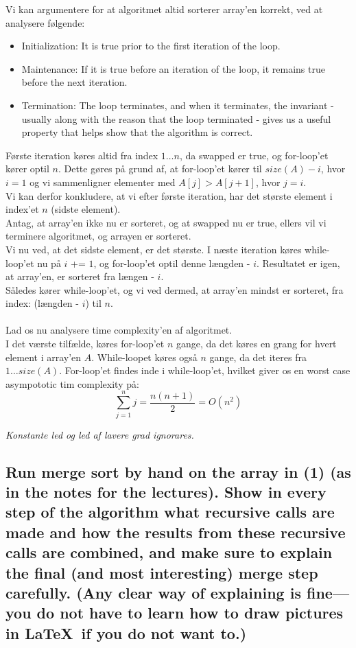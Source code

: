 \documentclass[a4paper,12pt]{article}
\begin{document}
Vi kan argumentere for at algoritmet altid sorterer array'en korrekt, ved at analysere følgende:
\begin{itemize}
    \item Initialization: It is true prior to the first iteration of the loop.
    \item Maintenance: If it is true before an iteration of the loop, it remains true before the next iteration.
    \item Termination: The loop terminates, and when it terminates, the invariant - usually along with the reason that the loop terminated - gives us a useful property that helps show that the algorithm is correct.
\end{itemize}
Første iteration køres altid fra index $1\dots n$, da swapped er true, og for-loop'et kører optil $n$. Dette gøres på grund af, at for-loop'et kører til $size(A) - i$, hvor $i = 1$ og vi sammenligner elementer med $A[j] > A[j+1]$, hvor $j = i$.\\
Vi kan derfor konkludere, at vi efter første iteration, har det største element i index'et $n$ (sidste element).\\
Antag, at array'en ikke nu er sorteret, og at swapped nu er true, ellers vil vi terminere algoritmet, og arrayen er sorteret.\\
Vi nu ved, at det sidste element, er det største. I næste iteration køres while-loop'et nu på $i$ += $1$, og for-loop'et optil denne længden - $i$. Resultatet er igen, at array'en, er sorteret fra længen - $i$.\\ 
Således kører while-loop'et, og vi ved dermed, at array'en mindst er sorteret, fra index: (længden - $i$) til $n$.\\
\\
Lad os nu analysere time complexity'en af algoritmet.\\
I det værste tilfælde, køres for-loop'et $n$ gange, da det køres en grang for hvert element i array'en $A$. While-loopet køres også $n$ gange, da det iteres fra $1\dots size(A)$. For-loop'et findes inde i while-loop'et, hvilket giver os en worst case asympototic tim complexity på:\\
\[\sum_{j=1}^{n}j = \dfrac{n(n+1)}{2} = O(n^2)\]
\begin{center}
    \textit{Konstante led og led af lavere grad ignorares.}
\end{center}
\subsection[]{Run merge sort by hand on the array in (1) (as in the notes for the lectures). Show in every step of the algorithm what recursive calls are made and how the results from these recursive calls are combined, and make sure to explain the final (and most interesting) merge step carefully. (Any clear way of explaining is fine—you do not have to learn how to draw pictures in \LaTeX\ if you do not want to.)} 
\end{document}
